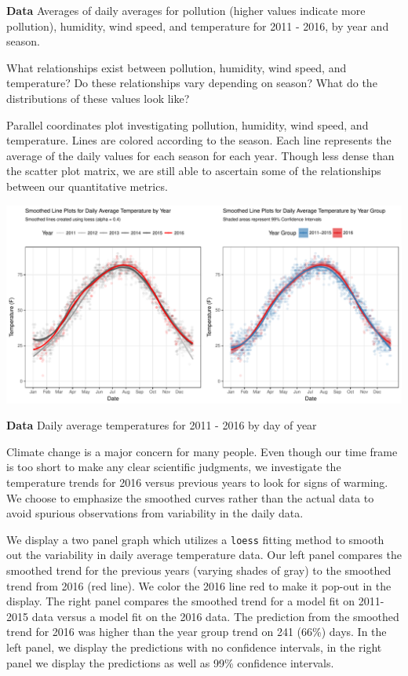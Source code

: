 \documentclass[landscape]{article}
\begin{document}
\textbf{Data} Averages of daily averages for pollution (higher values
indicate more pollution), humidity, wind speed, and temperature for 2011
- 2016, by year and season.

What relationships exist between pollution, humidity, wind speed, and
temperature? Do these relationships vary depending on season? What do
the distributions of these values look like?

Parallel coordinates plot investigating pollution, humidity, wind speed,
and temperature. Lines are colored according to the season. Each line
represents the average of the daily values for each season for each
year. Though less dense than the scatter plot matrix, we are still able
to ascertain some of the relationships between our quantitative metrics.

\newpage

\begin{center}\includegraphics{RoughSketches_files/figure-latex/unnamed-chunk-5-1} \end{center}

\textbf{Data} Daily average temperatures for 2011 - 2016 by day of year

Climate change is a major concern for many people. Even though our time
frame is too short to make any clear scientific judgments, we
investigate the temperature trends for 2016 versus previous years to
look for signs of warming. We choose to emphasize the smoothed curves
rather than the actual data to avoid spurious observations from
variability in the daily data.

We display a two panel graph which utilizes a \texttt{loess} fitting
method to smooth out the variability in daily average temperature data.
Our left panel compares the smoothed trend for the previous years
(varying shades of gray) to the smoothed trend from 2016 (red line). We
color the 2016 line red to make it pop-out in the display. The right
panel compares the smoothed trend for a model fit on 2011-2015 data
versus a model fit on the 2016 data. The prediction from the smoothed
trend for 2016 was higher than the year group trend on 241 (66\%) days.
In the left panel, we display the predictions with no confidence
intervals, in the right panel we display the predictions as well as 99\%
confidence intervals.
\end{document}
